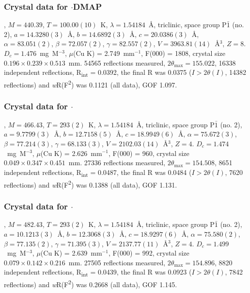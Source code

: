 \begin{refsection}
\subsubsection{Crystal data for \texorpdfstring{$\cdot$DMAP}{C22 H23 N3 O2 Se}}
, $M=440.39$, $T=100.00(10)$~K, $\lambda=1.54184$~\AA, triclinic, space group P$\bar{1}$ (no. 2), $a = 14.3280(3)$~\AA, $b = 14.6892(3)$~\AA, $c = 20.0386(3)$~\AA, $\alpha = 83.051(2)$\degree, $\beta = 72.057(2)$\degree, $\gamma = 82.557(2)$\degree, $V = 3963.81(14)$~\AA$^{3}$, $Z = 8$. $D_{c}= 1.476$~mg~M$^{-3}$, $\mu$(Cu K\a) = 2.749~mm$^{-1}$, F(000) = 1808, crystal size $0.196 \times 0.239 \times 0.513$~mm. 54565 reflections measured, $2\theta_{\mathrm{max}}=155.022$\degree, 16338 independent reflections, R\textsubscript{int} = 0.0392, the final R was 0.0375 ($I > 2\theta(I)$, 14382 reflections) and \emph{w}R(F\textsuperscript{2}) was 0.1121 (all data), GOF 1.097.

\subsubsection{Crystal data for \texorpdfstring{$\cdot$}{C24 H25 N3 O2 Se}}
, $M=466.43$, $T=293(2)$~K, $\lambda=1.54184$~\AA, triclinic, space group P$\bar{1}$ (no. 2), $a = 9.7799(3)$~\AA, $b = 12.7158(5)$~\AA, $c = 18.9949(6)$~\AA, $\alpha = 75.672(3)$\degree, $\beta = 77.214(3)$\degree, $\gamma = 68.133(3)$\degree, $V = 2102.03(14)$~\AA$^{3}$, $Z = 4$. $D_{c}= 1.474$~mg~M$^{-3}$, $\mu$(Cu K\a) = 2.626~mm$^{-1}$, F(000) = 960, crystal size $0.049 \times 0.347 \times 0.451$~mm. 27336 reflections measured, $2\theta_{\mathrm{max}}=154.508$\degree, 8651 independent reflections, R\textsubscript{int} = 0.0487, the final R was 0.0484 ($I > 2\theta(I)$, 7620 reflections) and \emph{w}R(F\textsuperscript{2}) was 0.1388 (all data), GOF 1.131.

\subsubsection{Crystal data for \texorpdfstring{$\cdot$}{C24 H25 N3 O3 Se}}
, $M=482.43$, $T=293(2)$~K, $\lambda=1.54184$~\AA, triclinic, space group P$\bar{1}$ (no. 2), $a = 10.1213(3)$~\AA, $b = 12.3068(3)$~\AA, $c = 18.9297(6)$~\AA, $\alpha = 75.580(2)$\degree, $\beta = 77.135(2)$\degree, $\gamma = 71.395(3)$\degree, $V = 2137.77(11)$~\AA$^{3}$, $Z = 4$. $D_{c}= 1.499$~mg~M$^{-3}$, $\mu$(Cu K\a) = 2.639~mm$^{-1}$, F(000) = 992, crystal size $0.079 \times 0.142 \times 0.216$~mm. 27505 reflections measured, $2\theta_{\mathrm{max}}=154.896$\degree, 8820 independent reflections, R\textsubscript{int} = 0.0439, the final R was 0.0923 ($I > 2\theta(I)$, 7842 reflections) and \emph{w}R(F\textsuperscript{2}) was 0.2668 (all data), GOF 1.145.


\end{refsection}
